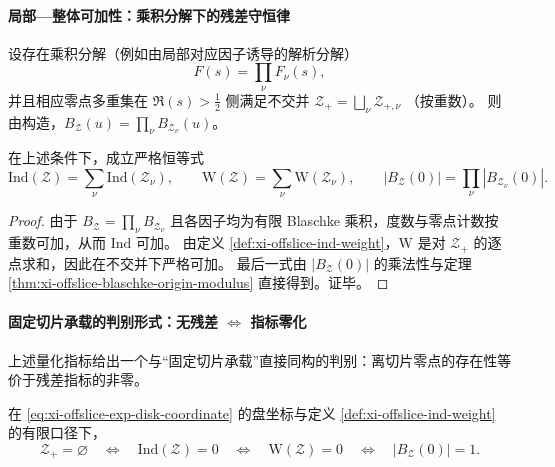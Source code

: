 \paragraph{局部—整体可加性：乘积分解下的残差守恒律}
设存在乘积分解（例如由局部对应因子诱导的解析分解）
\[
F(s)=\prod_{\nu}F_{\nu}(s),
\]
并且相应零点多重集在 \(\Re(s)>\tfrac12\) 侧满足不交并
\(
\mathcal Z_{+}=\bigsqcup_{\nu}\mathcal Z_{+,\nu}
\)
（按重数）。
则由构造，\(B_{\mathcal Z}(u)=\prod_{\nu}B_{\mathcal Z_\nu}(u)\)。

\begin{theorem}[残差指标可加性]\label{thm:xi-offslice-indicators-additivity}
在上述条件下，成立严格恒等式
\[
\mathrm{Ind}(\mathcal Z)=\sum_{\nu}\mathrm{Ind}(\mathcal Z_{\nu}),
\qquad
\mathrm{W}(\mathcal Z)=\sum_{\nu}\mathrm{W}(\mathcal Z_{\nu}),
\qquad
|B_{\mathcal Z}(0)|=\prod_{\nu}|B_{\mathcal Z_{\nu}}(0)|.
\]
\end{theorem}

\begin{proof}
由于 \(B_{\mathcal Z}=\prod_{\nu}B_{\mathcal Z_\nu}\) 且各因子均为有限 Blaschke 乘积，度数与零点计数按重数可加，从而 \(\mathrm{Ind}\) 可加。
由定义 \ref{def:xi-offslice-ind-weight}，\(\mathrm{W}\) 是对 \(\mathcal Z_{+}\) 的逐点求和，因此在不交并下严格可加。
最后一式由 \(|B_{\mathcal Z}(0)|\) 的乘法性与定理 \ref{thm:xi-offslice-blaschke-origin-modulus} 直接得到。证毕。
\end{proof}

\paragraph{固定切片承载的判别形式：无残差 \texorpdfstring{$\Leftrightarrow$}{<->} 指标零化}
上述量化指标给出一个与“固定切片承载”直接同构的判别：离切片零点的存在性等价于残差指标的非零。

\begin{proposition}[固定切片承载的指标判别]\label{prop:xi-offslice-fixed-slice-indicator-criterion}
在 \eqref{eq:xi-offslice-exp-disk-coordinate} 的盘坐标与定义 \ref{def:xi-offslice-ind-weight} 的有限口径下，
\[
\mathcal Z_{+}=\varnothing
\quad\Longleftrightarrow\quad
\mathrm{Ind}(\mathcal Z)=0
\quad\Longleftrightarrow\quad
\mathrm{W}(\mathcal Z)=0
\quad\Longleftrightarrow\quad
|B_{\mathcal Z}(0)|=1.
\]
\end{proposition}

